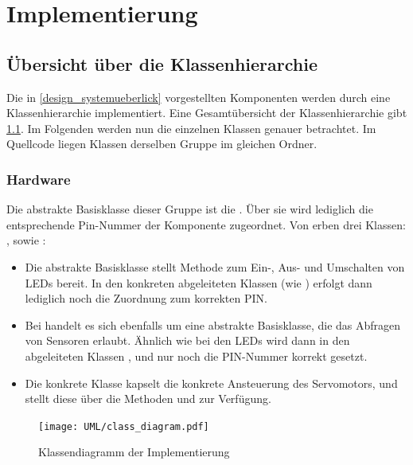 \chapter{Implementierung}\label{k_implementierung}
\section{Übersicht über die Klassenhierarchie}
Die in \cref{design_systemueberlick} vorgestellten Komponenten werden durch eine Klassenhierarchie implementiert.
Eine Gesamtübersicht der Klassenhierarchie gibt \cref{uml:class_diagram}.
Im Folgenden werden nun die einzelnen Klassen genauer betrachtet.
Im Quellcode liegen Klassen derselben Gruppe im gleichen Ordner.

\subsection{Hardware}
Die abstrakte Basisklasse dieser Gruppe ist die .
Über sie wird lediglich die entsprechende Pin-Nummer der Komponente zugeordnet.
Von  erben drei Klassen: ,  sowie :

\begin{itemize}
	\item Die abstrakte Basisklasse  stellt Methode zum Ein-, Aus- und Umschalten von LEDs bereit.
In den konkreten abgeleiteten Klassen (wie ) erfolgt dann lediglich noch die Zuordnung zum korrekten PIN.
	\item Bei  handelt es sich ebenfalls um eine abstrakte Basisklasse, die das Abfragen von Sensoren erlaubt.
Ähnlich wie bei den LEDs wird dann in den abgeleiteten Klassen ,  und  nur noch die PIN-Nummer korrekt gesetzt.
	\item Die konkrete Klasse  kapselt die konkrete Ansteuerung des Servomotors, und stellt diese über die Methoden  und  zur Verfügung.
\end{itemize}

\begin{figure}[htb!] \centering
	\texttt{[image: UML/class\_diagram.pdf]}
	\caption{Klassendiagramm der Implementierung}
	\label{uml:class_diagram}
\end{figure}

